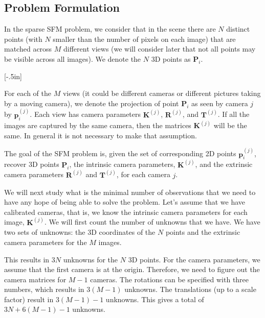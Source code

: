 
\subsection{Problem Formulation}

In the sparse SFM problem, we consider that in the scene there are $N$ distinct points (with $N$ smaller than the number of pixels on each image) that are matched across $M$ different views (we will consider later that not all points may be visible across all images). We denote the $N$ 3D points as $\mathbf{P}_i$.

[-.5in]

For each of the $M$ views (it could be different cameras or different pictures taking by a moving camera), we denote the projection of point $\mathbf{P}_i$ as seen by camera $j$ by $\mathbf{p}^{(j)}_i$. Each view has camera parameters ${\mathbf K}^{(j)}$, ${\mathbf R}^{(j)}$, and ${\mathbf T}^{(j)}$. If all the images are captured by the same camera, then the matrices ${\mathbf K}^{(j)}$ will be the same. In general it is not necessary to make that assumption.

The goal of the SFM problem is, given the set of corresponding 2D points $\mathbf{p}^{(j)}_i$, recover 3D points $\mathbf{P}_i$, the intrinsic camera parameters, ${\mathbf K}^{(j)}$, and the extrinsic camera parameters ${\mathbf R}^{(j)}$ and ${\mathbf T}^{(j)}$, for each camera $j$.

We will next study what is the minimal number of observations that we need to have any hope of being able to solve the problem. Let's assume that we have calibrated cameras, that is, we know the intrinsic camera parameters for each image, ${\mathbf K}^{(j)}$. We will first count the number of unknowns that we have. We have two sets of unknowns: the 3D coordinates of the $N$ points and the extrinsic camera parameters for the $M$ images.

This results in 3$N$ unknowns for the $N$ 3D points. For the camera parameters, we assume that the first camera is at the origin. Therefore, we need to figure out the camera matrices for $M-1$ cameras. The rotations can be specified with three numbers, which results in $3(M-1)$ unknowns. The translations (up to a scale factor) result in  $3(M-1)-1$ unknowns. This gives a total of $3N + 6(M-1)-1$ unknowns.

